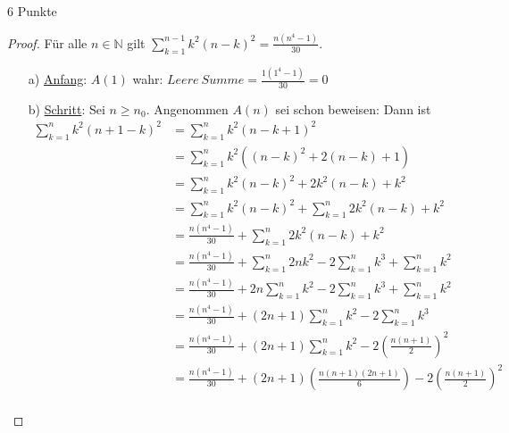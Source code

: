 \documentclass{problemset}
\begin{document}
\begin{problem}[Summenformeln]{6 Punkte}
\begin{proof}
    Für alle $n \in \mathbb{N}$ gilt $\sum_{k = 1}^{n - 1} k^2(n - k)^2 = \frac{n(n^4 - 1)}{30}$.
    \begin{enumerate}
        \item[a)] \underline{Anfang}: $A(1)$ wahr: $Leere\ Summe = \frac{1(1^4 - 1)}{30} = 0$
        \item[b)] \underline{Schritt}: Sei $n \ge n_0$. Angenommen $A(n)$ sei schon beweisen:
              Dann ist
              \begin{align}
                  \sum_{k = 1}^{n} k^2(n + 1 - k)^2 & = \sum_{k = 1}^{n} k^2(n - k + 1)^2                                                                       \\
                                                    & = \sum_{k = 1}^{n} k^2((n - k)^2 + 2(n-k)+ 1)                                                             \\
                                                    & = \sum_{k = 1}^{n} k^2(n - k)^2 + 2k^2(n-k) + k^2                                                         \\
                                                    & = \sum_{k = 1}^{n} k^2(n - k)^2 + \sum_{k=1}^{n} 2k^2(n-k) + k^2                                          \\
                                                    & = \frac{n(n^4 - 1)}{30} + \sum_{k=1}^{n} 2k^2(n-k) + k^2                                                  \\
                                                    & = \frac{n(n^4 - 1)}{30} + \sum_{k=1}^{n} 2nk^2 - 2\sum_{k=1}^{n} k^3 + \sum_{k=1}^{n} k^2                 \\
                                                    & = \frac{n(n^4 - 1)}{30} + 2n\sum_{k=1}^{n} k^2 - 2\sum_{k=1}^{n} k^3 + \sum_{k=1}^{n} k^2                 \\
                                                    & = \frac{n(n^4 - 1)}{30} + (2n+1)\sum_{k=1}^{n} k^2 - 2\sum_{k=1}^{n} k^3 \tag{aus 1.a}                    \\
                                                    & = \frac{n(n^4 - 1)}{30} + (2n+1)\sum_{k=1}^{n} k^2 - 2\left(\frac{n(n+1)}{2}\right)^2 \tag{aus Vorlesung} \\
                                                    & = \frac{n(n^4 - 1)}{30} + (2n+1)\left(\frac{n(n+1)(2n+1)}{6}\right) - 2\left(\frac{n(n+1)}{2}\right)^2    \\

\end{align}
\end{enumerate}
\end{proof}
\end{problem}
\end{document}
